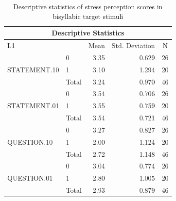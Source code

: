 \documentclass[a4paper]{article}
\begin{document}
\begin{table}[H]
  \begin{center}
      \caption{Descriptive statistics of stress perception scores in bisyllabic target stimuli}
        \label{tab:anova-sum-2}
\begin{tabular}{|l|l|r|r|r|} 
\hline
\multicolumn{5}{|c|}{Descriptive Statistics}                                                                                      \\ 
\hline
L1                            & ~     & \multicolumn{1}{c|}{Mean} & \multicolumn{1}{c|}{Std. Deviation} & \multicolumn{1}{c|}{N}  \\ 
\hline
\multirow{3}{*}{STATEMENT.10} & 0     & 3.35                      & 0.629                               & 26                      \\ 
\cline{2-5}
                              & 1     & 3.10                      & 1.294                               & 20                      \\ 
\cline{2-5}
                              & Total & 3.24                      & 0.970                               & 46                      \\ 
\hline
\multirow{3}{*}{STATEMENT.01} & 0     & 3.54                      & 0.706                               & 26                      \\ 
\cline{2-5}
                              & 1     & 3.55                      & 0.759                               & 20                      \\ 
\cline{2-5}
                              & Total & 3.54                      & 0.721                               & 46                      \\ 
\hline
\multirow{3}{*}{QUESTION.10}  & 0     & 3.27                      & 0.827                               & 26                      \\ 
\cline{2-5}
                              & 1     & 2.00                      & 1.124                               & 20                      \\ 
\cline{2-5}
                              & Total & 2.72                      & 1.148                               & 46                      \\ 
\hline
\multirow{3}{*}{QUESTION.01}  & 0     & 3.04                      & 0.774                               & 26                      \\ 
\cline{2-5}
                              & 1     & 2.80                      & 1.005                               & 20                      \\ 
\cline{2-5}
                              & Total & 2.93                      & 0.879                               & 46                      \\
\hline
\end{tabular}
\end{center}
\end{table}
\end{document}
